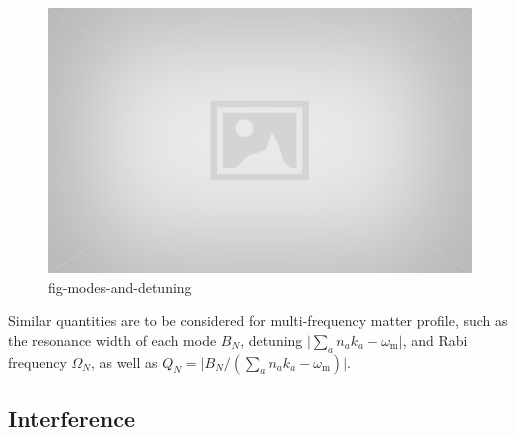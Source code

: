 \documentclass[%
reprint,
 amsmath,amssymb,
 aps,
]{revtex4-1}
\begin{document}
\begin{figure}[!htbp]
                \centering
                \includegraphics[width=\columnwidth]{assets/placeholder.jpg}%
                \caption{fig-modes-and-detuning}
                \label{fig-modes-and-detuning}
\end{figure}




Similar quantities are to be considered for multi-frequency matter profile, such as the resonance width of each mode $B_N$, detuning $\lvert \sum_a n_a k_a - \omega_{\mathrm{m}} \rvert$, and Rabi frequency $\Omega_N$, as well as $Q_N =\lvert B_N/( \sum_a n_a k_a - \omega_{\mathrm{m}}  )\rvert$.






\subsection{Interference}
\end{document}
